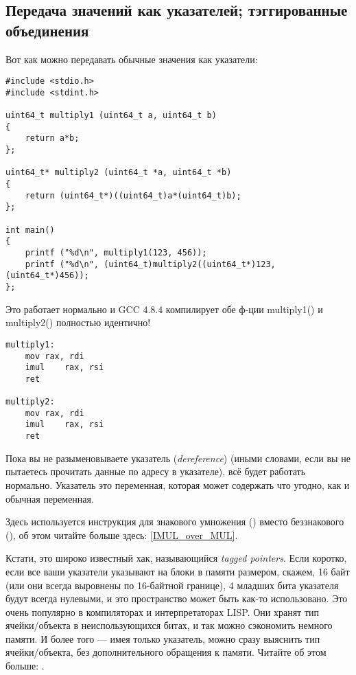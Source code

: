 \subsection{Передача значений как указателей; тэггированные объединения}

Вот как можно передавать обычные значения как указатели:

\begin{lstlisting}[label=unsigned_multiply_C,style=customc]
#include <stdio.h>
#include <stdint.h>

uint64_t multiply1 (uint64_t a, uint64_t b)
{
	return a*b;
};

uint64_t* multiply2 (uint64_t *a, uint64_t *b)
{
	return (uint64_t*)((uint64_t)a*(uint64_t)b);
};

int main()
{
	printf ("%d\n", multiply1(123, 456));
	printf ("%d\n", (uint64_t)multiply2((uint64_t*)123, (uint64_t*)456));
};
\end{lstlisting}

Это работает нормально и GCC 4.8.4 компилирует обе ф-ции multiply1() и multiply2() полностью идентично!

\begin{lstlisting}[label=unsigned_multiply_lst,style=customasmx86]
multiply1:
	mov	rax, rdi
	imul	rax, rsi
	ret

multiply2:
	mov	rax, rdi
	imul	rax, rsi
	ret
\end{lstlisting}

Пока вы не разыменовываете указатель (\emph{dereference}) (иными словами, если вы не пытаетесь прочитать данные
по адресу в указателе), всё будет работать нормально.
Указатель это переменная, которая может содержать что угодно, как и обычная переменная.

Здесь используется инструкция для знакового умножения (\IMUL) вместо беззнакового (\MUL), об этом читайте больше здесь:
\ref{IMUL_over_MUL}.

Кстати, это широко известный хак, называющийся \emph{tagged pointers}.
Если коротко, если все ваши указатели указывают на блоки в памяти размером, скажем, 16 байт (или они всегда
выровнены по 16-байтной границе), 4 младших бита указателя будут всегда нулевыми, и это пространство может быть
как-то использовано.
Это очень популярно в компиляторах и интерпретаторах LISP.
Они хранят тип ячейки/объекта в неиспользующихся битах, и так можно сэкономить немного памяти.
И более того --- имея только указатель, можно сразу выяснить тип ячейки/объекта, без дополнительного обращения к памяти.
Читайте об этом больше: .


